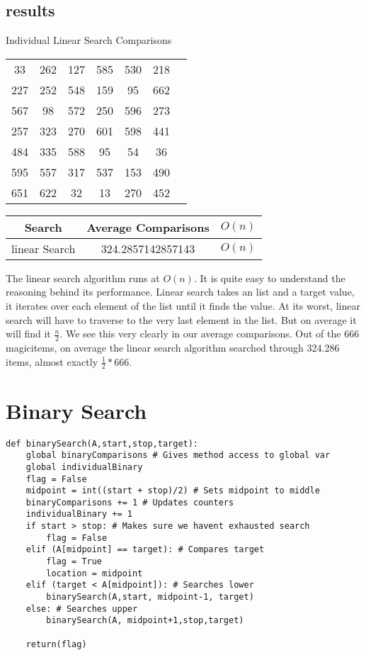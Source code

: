 \documentclass{article}
\begin{document}
\subsection{results}
\begin{center}
Individual Linear Search Comparisons

\vspace{2mm}
\begin{tabular}{ c c c c c c c }
33 & 262 & 127 & 585 & 530 & 218 \\
227 & 252 & 548 & 159 & 95 & 662 \\
567 & 98 & 572 & 250 & 596 & 273 \\
257 & 323 & 270 & 601 & 598 & 441\\
484 & 335 & 588 & 95 & 54 & 36 \\
595 & 557 & 317 & 537 & 153 & 490 \\
651 & 622 & 32 & 13 & 270 & 452
\end{tabular}
\end{center}
\begin{tabular}{c|c|c}
    Search & Average Comparisons & $O(n)$ \\
\hline
    linear Search & 324.2857142857143 & $O(n)$
\end{tabular}
\vspace{5mm}

The linear search algorithm runs at $O(n)$. It is quite easy to understand the reasoning behind its performance. Linear search takes an list and a target value, it iterates over each element of the list until it finds the value. At its worst, linear search will have to traverse to the very last element in the list. But on average it will find it $\frac{n}{2}$. We see this very clearly in our average comparisons. Out of the 666 magicitems, on average the linear search algorithm searched through 324.286 items, almost exactly $\frac{1}{2}*666$.



\newpage

\section{Binary Search}
\label{Binary Search}
\begin{lstlisting}
def binarySearch(A,start,stop,target):
    global binaryComparisons # Gives method access to global var
    global individualBinary
    flag = False
    midpoint = int((start + stop)/2) # Sets midpoint to middle
    binaryComparisons += 1 # Updates counters
    individualBinary += 1
    if start > stop: # Makes sure we havent exhausted search       
        flag = False
    elif (A[midpoint] == target): # Compares target
        flag = True
        location = midpoint
    elif (target < A[midpoint]): # Searches lower 
        binarySearch(A,start, midpoint-1, target)   
    else: # Searches upper
        binarySearch(A, midpoint+1,stop,target)

    return(flag)
\end{lstlisting}
\end{document}
